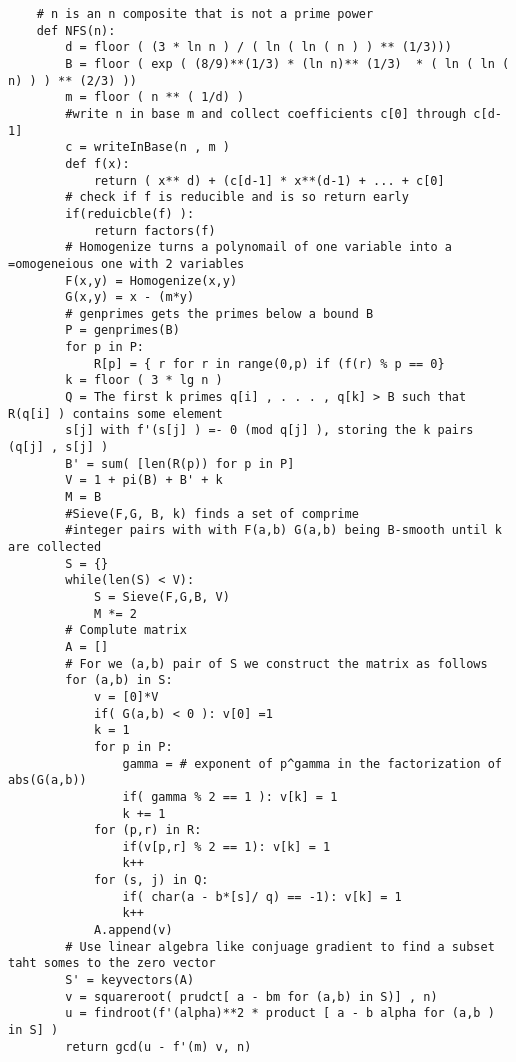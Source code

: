 \documentclass{article}
\begin{document}
\begin{verbatim}
    # n is an n composite that is not a prime power
    def NFS(n):
        d = floor ( (3 * ln n ) / ( ln ( ln ( n ) ) ** (1/3)))
        B = floor ( exp ( (8/9)**(1/3) * (ln n)** (1/3)  * ( ln ( ln ( n) ) ) ** (2/3) ))
        m = floor ( n ** ( 1/d) )
        #write n in base m and collect coefficients c[0] through c[d-1]
        c = writeInBase(n , m )
        def f(x):
            return ( x** d) + (c[d-1] * x**(d-1) + ... + c[0]
        # check if f is reducible and is so return early
        if(reduicble(f) ):
            return factors(f)
        # Homogenize turns a polynomail of one variable into a =omogeneious one with 2 variables
        F(x,y) = Homogenize(x,y)
        G(x,y) = x - (m*y)
        # genprimes gets the primes below a bound B
        P = genprimes(B)
        for p in P:
            R[p] = { r for r in range(0,p) if (f(r) % p == 0}
        k = floor ( 3 * lg n )
        Q = The first k primes q[i] , . . . , q[k] > B such that R(q[i] ) contains some element
        s[j] with f'(s[j] ) =- 0 (mod q[j] ), storing the k pairs (q[j] , s[j] )
        B' = sum( [len(R(p)) for p in P]
        V = 1 + pi(B) + B' + k
        M = B
        #Sieve(F,G, B, k) finds a set of comprime
        #integer pairs with with F(a,b) G(a,b) being B-smooth until k are collected
        S = {}
        while(len(S) < V):
            S = Sieve(F,G,B, V)
            M *= 2
        # Complute matrix
        A = []
        # For we (a,b) pair of S we construct the matrix as follows
        for (a,b) in S:
            v = [0]*V
            if( G(a,b) < 0 ): v[0] =1
            k = 1
            for p in P:
                gamma = # exponent of p^gamma in the factorization of abs(G(a,b))
                if( gamma % 2 == 1 ): v[k] = 1
                k += 1
            for (p,r) in R:
                if(v[p,r] % 2 == 1): v[k] = 1
                k++
            for (s, j) in Q:
                if( char(a - b*[s]/ q) == -1): v[k] = 1
                k++
            A.append(v)
        # Use linear algebra like conjuage gradient to find a subset taht somes to the zero vector
        S' = keyvectors(A)
        v = squareroot( prudct[ a - bm for (a,b) in S)] , n)
        u = findroot(f'(alpha)**2 * product [ a - b alpha for (a,b ) in S] )
        return gcd(u - f'(m) v, n)
\end{verbatim}
\end{document}
